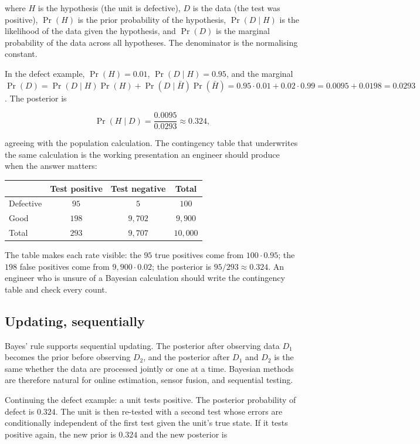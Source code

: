 where $H$ is the hypothesis (the unit is defective), $D$ is the
data (the test was positive), $\Pr(H)$ is the prior probability of
the hypothesis, $\Pr(D \mid H)$ is the likelihood of the data given
the hypothesis, and $\Pr(D)$ is the marginal probability of the
data across all hypotheses. The denominator is the normalising
constant.

In the defect example, $\Pr(H) = 0.01$, $\Pr(D \mid H) = 0.95$,
and the marginal $\Pr(D) = \Pr(D \mid H) \Pr(H) + \Pr(D \mid \bar H)
\Pr(\bar H) = 0.95 \cdot 0.01 + 0.02 \cdot 0.99 = 0.0095 + 0.0198 =
0.0293$. The posterior is

\[
\Pr(H \mid D) = \frac{0.0095}{0.0293} \approx 0.324,
\]

agreeing with the population calculation. The contingency table
that underwrites the same calculation is the working presentation
an engineer should produce when the answer matters:

\begin{center}
\begin{tabular}{lccc}
\toprule
& Test positive & Test negative & Total \\
\midrule
Defective & $95$ & $5$ & $100$ \\
Good & $198$ & $9{,}702$ & $9{,}900$ \\
\midrule
Total & $293$ & $9{,}707$ & $10{,}000$ \\
\bottomrule
\end{tabular}
\end{center}

The table makes each rate visible: the $95$ true positives come
from $100 \cdot 0.95$; the $198$ false positives come from $9{,}900
\cdot 0.02$; the posterior is $95/293 \approx 0.324$. An engineer
who is unsure of a Bayesian calculation should write the contingency
table and check every count.

\subsection{Updating, sequentially}

Bayes' rule supports sequential updating. The posterior after
observing data $D_{1}$ becomes the prior before observing $D_{2}$,
and the posterior after $D_{1}$ and $D_{2}$ is the same whether the
data are processed jointly or one at a time. Bayesian methods are
therefore natural for online estimation, sensor fusion, and
sequential testing.

Continuing the defect example: a unit tests positive. The posterior
probability of defect is $0.324$. The unit is then re-tested with a
second test whose errors are conditionally independent of the first
test given the unit's true state. If it tests positive again, the
new prior is $0.324$ and the new posterior is

